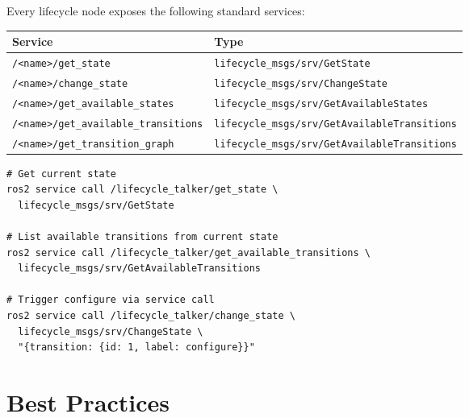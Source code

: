 \documentclass[12pt,a4paper]{article}
\newcommand{\code}[1]{\texttt{#1}}
\begin{document}
Every lifecycle node exposes the following standard services:

\begin{center}
\begin{tabular}{ll}
  \toprule
  \textbf{Service} & \textbf{Type} \\
  \midrule
  \code{/<name>/get\_state}                   & \code{lifecycle\_msgs/srv/GetState} \\
  \code{/<name>/change\_state}                & \code{lifecycle\_msgs/srv/ChangeState} \\
  \code{/<name>/get\_available\_states}       & \code{lifecycle\_msgs/srv/GetAvailableStates} \\
  \code{/<name>/get\_available\_transitions}  & \code{lifecycle\_msgs/srv/GetAvailableTransitions} \\
  \code{/<name>/get\_transition\_graph}       & \code{lifecycle\_msgs/srv/GetAvailableTransitions} \\
  \bottomrule
\end{tabular}
\end{center}

\begin{lstlisting}[style=bash,caption={Calling lifecycle services directly}]
# Get current state
ros2 service call /lifecycle_talker/get_state \
  lifecycle_msgs/srv/GetState

# List available transitions from current state
ros2 service call /lifecycle_talker/get_available_transitions \
  lifecycle_msgs/srv/GetAvailableTransitions

# Trigger configure via service call
ros2 service call /lifecycle_talker/change_state \
  lifecycle_msgs/srv/ChangeState \
  "{transition: {id: 1, label: configure}}"
\end{lstlisting}

\section{Best Practices}
\label{sec:bestpractices}
\end{document}
